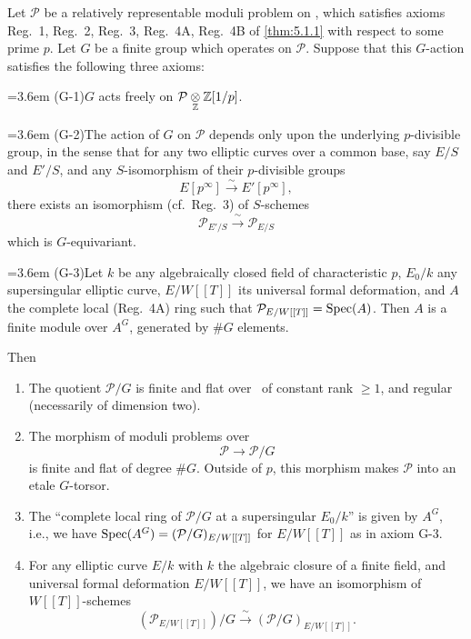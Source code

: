 \begin{arqt}\label{thm:7.5.1}
Let $\mathcal{P}$ be a relatively representable moduli problem on \Ell, which satisfies axioms Reg.~1, Reg.~2, Reg.~3, Reg.~4A, Reg.~4B of \ref{thm:5.1.1} with respect to some prime $p$. Let $G$ be a finite group which operates on $\mathcal{P}$. Suppose that this $G$-action satisfies the following three axioms:
\begin{kmindent}
\noindent\hangindent=3.6em (G-1)\quad $G$ acts freely on $\mathcal{P} \underset{\mathbb{Z}}{\otimes} \mathbb{Z}[1/p]$.

\noindent\hangindent=3.6em (G-2)\quad The action of $G$ on $\mathcal{P}$ depends only upon the underlying $p$-divisible group, in the sense that for any two elliptic curves over a common base, say $E/S$ and $E'/S$, and any $S$-isomorphism of their $p$-divisible groups
\[
E[p^\infty] \xrightarrow{\ \sim\ } E'[p^\infty] ,
\]
there exists an isomorphism (cf.\ Reg.~3) of $S$-schemes
\[
\mathcal{P}_{E'/S} \xrightarrow{\ \sim\ } \mathcal{P}_{E/S}
\]
which is $G$-equivariant.

\noindent\hangindent=3.6em (G-3)\quad Let $k$ be any algebraically closed field of characteristic $p$, $E_0/k$ any supersingular elliptic curve, $E/W[[T]]$ its universal formal deformation, and $A$ the complete local (Reg.~4A) ring such that $\mathcal{P}_{E/W[[T]]} = \operatorname{Spec}(A)$. Then $A$ is a finite module over $A^G$, generated by $\#G$ elements.
\end{kmindent}
\noindent Then
\begin{enumerate}[(1)]
\item The quotient $\mathcal{P}/G$ is finite and flat over \Ell\ of constant rank $\geq 1$, and regular (necessarily of dimension two).
\item The morphism of moduli problems over \Ell
\[
\mathcal{P} \to \mathcal{P}/G
\]
is finite and flat of degree $\#G$. Outside of $p$, this morphism makes $\mathcal{P}$ into an etale $G$-torsor.
\item The ``complete local ring of $\mathcal{P}/G$ at a supersingular $E_0/k$'' is given by $A^G$, i.e., we have $\operatorname{Spec}(A^G) = (\mathcal{P}/G)_{E/W[[T]]}$ for $E/W[[T]]$ as in axiom G-3.
\item For any elliptic curve $E/k$ with $k$ the algebraic closure of a finite field, and universal formal deformation $E/W[[T]]$, we have an isomorphism of $W[[T]]$-schemes
\[
(\mathcal{P}_{E/W[[T]]})/G \xrightarrow{\ \sim\ } (\mathcal{P}/G)_{E/W[[T]]} .
\]
\end{enumerate}
\end{arqt}


